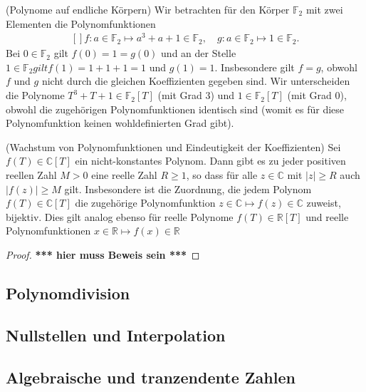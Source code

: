 \documentclass[../Analysis1_script.tex]{subfiles}
\begin{document}
\begin{example}{(Polynome auf endliche Körpern)}
	Wir betrachten für den Körper $\mathbb {F}_2$ mit zwei Elementen die Polynomfunktionen 
	\[\begin{aligned}[]
		f:a\in \mathbb {F}_2 \mapsto a^3+a+1 \in \mathbb {F}_2,\quad g:a\in \mathbb {F}_2 \mapsto 1 \in \mathbb {F}_2.
	\end{aligned}\]
	Bei $0\in \mathbb {F}_2$ gilt $f(0) = 1 = g(0)$ und an der Stelle $1\in \mathbb {F}_2 gilt f(1) = 1+1+1 = 1$ und $g(1) = 1$. Insbesondere gilt $f=g$, obwohl $f$ und $g$ nicht durch die gleichen Koeffizienten gegeben sind. Wir unterscheiden die Polynome $T^3+T+1\in \mathbb {F}_2[T]$ (mit Grad $3$) und $1\in \mathbb {F}_2[T]$ (mit Grad $0$), obwohl die zugehörigen Polynomfunktionen identisch sind (womit es für diese Polynomfunktion keinen wohldefinierten Grad gibt). 
\end{example}

\begin{proposition}{(Wachstum von Polynomfunktionen und Eindeutigkeit der Koeffizienten)}
	Sei $f(T) \in \mathbb {C}[T]$ ein nicht-konstantes Polynom. Dann gibt es zu jeder positiven reellen Zahl $M > 0$ eine reelle Zahl $R \geq 1$, so dass für alle $z \in \mathbb {C}$ mit $|z| \geq R$ auch $|f(z)| \geq M$ gilt. Insbesondere ist die Zuordnung, die jedem Polynom $f(T) \in \mathbb {C}[T]$ die zugehörige Polynomfunktion $z \in \mathbb {C} \mapsto f(z) \in \mathbb {C}$ zuweist, bijektiv. Dies gilt analog ebenso für reelle Polynome $f(T)\in \mathbb {R}[T]$ und reelle Polynomfunktionen $x\in \mathbb {R}\mapsto f(x)\in \mathbb {R}$
\end{proposition}

\begin{proof}
\textbf{*** hier muss Beweis sein ***}
\end{proof}

\subsection{Polynomdivision}

\subsection{Nullstellen und Interpolation}

\subsection{Algebraische und tranzendente Zahlen}
\end{document}
